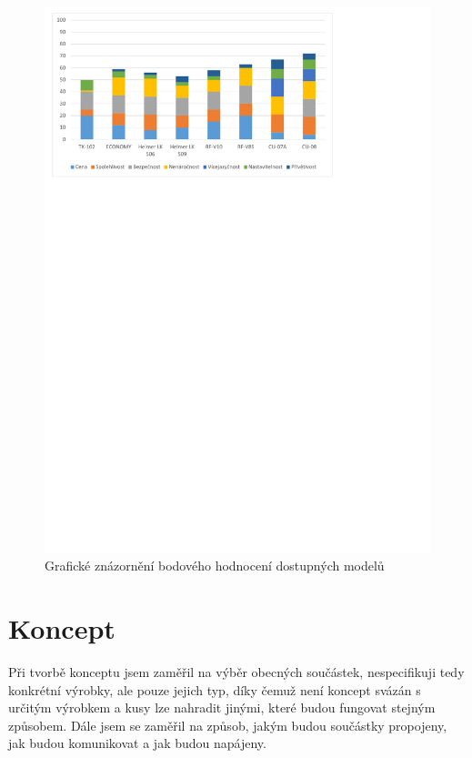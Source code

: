 \documentclass[FM,BP]{tulthesis}  %
\begin{document}
\begin{figure}[H]
\begin{center}
\includegraphics[width=\textwidth]{graphs/graf_bodoveHodnoceni.pdf}
\caption{Grafické znázornění bodového hodnocení dostupných modelů}
\label{image}
\end{center}
\end{figure}


\chapter{Koncept}
Při tvorbě konceptu jsem zaměřil na výběr obecných součástek, nespecifikuji tedy konkrétní výrobky, ale pouze jejich typ, díky čemuž není koncept svázán s určitým výrobkem a kusy lze nahradit jinými, které budou fungovat stejným způsobem. Dále jsem se zaměřil na způsob, jakým budou součástky propojeny, jak budou komunikovat a jak budou napájeny.
\end{document}
